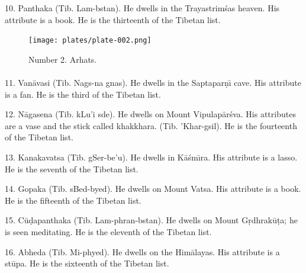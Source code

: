 \documentclass[a4paper, 12pt, oneside]{article}
\begin{document}
10. Panthaka (Tib. Lam-bstan). He dwells in the Trayastrim\'{s}as heaven. His attribute is a book. He is the thirteenth of the Tibetan list.

\clearpage
\vspace*{\fill}
\begin{figure}[H]
\centering
\texttt{[image: plates/plate-002.png]}
\caption*{Number 2. Arhats.}
\end{figure}
\vspace*{\fill}
\clearpage
\paragraph{}
11. Van\={a}vasi (Tib. Nags-na gnas). He dwells in the Saptapar\d{n}\={\i} cave. His attribute is a fan. He is the third of the Tibetan list.

12. N\={a}gasena (Tib. kLu'i sde). He dwells on Mount Vipulap\={a}r\'{s}va. His attributes are a vase and the stick called khakkhara. (Tib. 'Khar-gsil). He is the fourteenth of the Tibetan list.

13. Kanakavatsa (Tib. gSer-be'u). He dwells in K\={a}\'{s}m\={\i}ra. His attribute is a lasso. He is the seventh of the Tibetan list.

14. Gopaka (Tib. sBed-byed). He dwells on Mount Vatsa. His attribute is a book. He is the fifteenth of the Tibetan list.

15. C\={u}\d{d}apanthaka (Tib. Lam-phran-bstan). He dwells on Mount G\d{r}dhrak\={u}\d{t}a; he is seen meditating. He is the eleventh of the Tibetan list.

16. Abheda (Tib. Mi-phyed). He dwells on the Him\={a}layas. His attribute is a st\={u}pa. He is the sixteenth of the Tibetan list.
\end{document}
